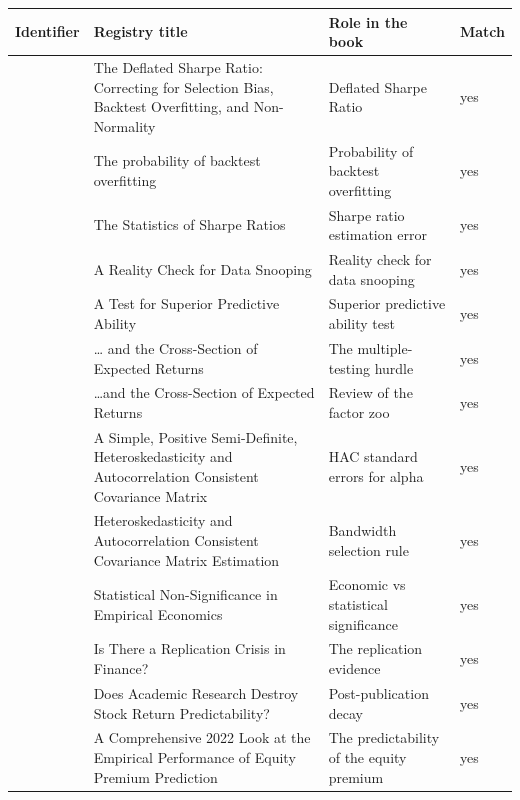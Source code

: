 \begin{tabular}{@{}P{1.32in}P{2.00in}P{0.92in}P{0.36in}@{}}
\toprule
Identifier & Registry title & Role in the book & Match \\
\midrule
{} & The Deflated Sharpe Ratio: Correcting for Selection Bias, Backtest Overfitting, and Non-Normality & Deflated Sharpe Ratio & yes \\
 & The probability of backtest overfitting & Probability of backtest overfitting & yes \\
 & The Statistics of Sharpe Ratios & Sharpe ratio estimation error & yes \\
 & A Reality Check for Data Snooping & Reality check for data snooping & yes \\
 & A Test for Superior Predictive Ability & Superior predictive ability test & yes \\
 & … and the Cross-Section of Expected Returns & The multiple-testing hurdle & yes \\
 & …and the Cross-Section of Expected Returns & Review of the factor zoo & yes \\
 & A Simple, Positive Semi-Definite, Heteroskedasticity and Autocorrelation Consistent Covariance Matrix & HAC standard errors for alpha & yes \\
 & Heteroskedasticity and Autocorrelation Consistent Covariance Matrix Estimation & Bandwidth selection rule & yes \\
 & Statistical Non-Significance in Empirical Economics & Economic vs statistical significance & yes \\
 & Is There a Replication Crisis in Finance? & The replication evidence & yes \\
 & Does Academic Research Destroy Stock Return Predictability? & Post-publication decay & yes \\
 & A Comprehensive 2022 Look at the Empirical Performance of Equity Premium Prediction & The predictability of the equity premium & yes \\

\end{tabular}
